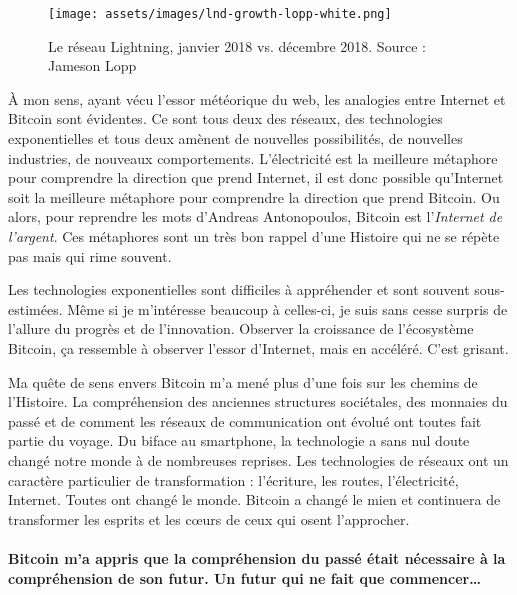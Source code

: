 \begin{figure}
  \texttt{[image: assets/images/lnd-growth-lopp-white.png]}
  \caption{Le réseau Lightning, janvier 2018 vs. décembre 2018. Source : Jameson
  Lopp}
  \label{fig:lnd-growth-lopp-white.png}
\end{figure}

À mon sens, ayant vécu l'essor météorique du web, les analogies entre Internet
et Bitcoin sont évidentes. Ce sont tous deux des réseaux, des technologies
exponentielles et tous deux amènent de nouvelles possibilités, de nouvelles
industries, de nouveaux comportements. L'électricité est la meilleure métaphore
pour comprendre la direction que prend Internet, il est donc possible
qu'Internet soit la meilleure métaphore pour comprendre la direction que prend
Bitcoin. Ou alors, pour reprendre les mots d'Andreas Antonopoulos, Bitcoin est
l'\textit{Internet de l'argent}. Ces métaphores sont un très bon rappel d'une
Histoire qui ne se répète pas mais qui rime souvent.

Les technologies exponentielles sont difficiles à appréhender et sont souvent
sous-estimées. Même si je m'intéresse beaucoup à celles-ci, je suis sans cesse
surpris de l'allure du progrès et de l'innovation. Observer la croissance de
l'écosystème Bitcoin, ça ressemble à observer l'essor d'Internet, mais en
accéléré. C'est grisant.

Ma quête de sens envers Bitcoin m'a mené plus d'une fois sur les chemins de
l'Histoire. La compréhension des anciennes structures sociétales, des monnaies
du passé et de comment les réseaux de communication ont évolué ont toutes fait
partie du voyage. Du biface au smartphone, la technologie a sans nul doute
changé notre monde à de nombreuses reprises. Les technologies de réseaux ont un
caractère particulier de transformation : l'écriture, les routes, l'électricité,
Internet. Toutes ont changé le monde. Bitcoin a changé le mien et continuera de
transformer les esprits et les cœurs de ceux qui osent l'approcher.

\paragraph{Bitcoin m'a appris que la compréhension du passé était nécessaire à
la compréhension de son futur. Un futur qui ne fait que commencer\ldots}

